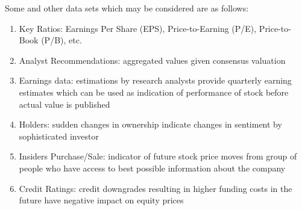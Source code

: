 Some  and other data sets which may be considered are as follows:
\begin{enumerate}[label=\roman*.]
\setlength{\itemsep}{0pt}
\item Key Ratios: Earnings Per Share (EPS), Price-to-Earning (P/E), Price-to-Book (P/B), etc. 
\item Analyst Recommendations: aggregated values given consensus valuation
\item Earnings data: estimations by research analysts provide quarterly earning estimates which can be used as indication of performance of stock before actual value is published
\item Holders: sudden changes in ownership indicate changes in sentiment by sophisticated investor
\item Insiders Purchase/Sale: indicator of future stock price moves from group of people who have access to best possible information about the company
\item Credit Ratings: credit downgrades resulting in higher funding costs in the future have negative impact on equity prices
\end{enumerate}